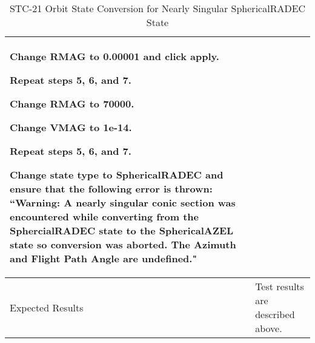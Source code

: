 \begin{table}[htbp!]
\begin{tabular}{|p{1.05 in} |p{4.75 in} |}
\begin{compactenum}
                 \item Change RMAG to 0.00001 and click apply.
                 \item Repeat steps 5, 6, and 7.
                 \item Change RMAG to 70000.
                 \item Change VMAG to 1e-14.
                 \item Repeat steps 5, 6, and 7.
                 \item Change state type to SphericalRADEC and ensure that the following error is thrown: ``Warning: A nearly singular conic section was encountered while converting from the SphercialRADEC state to the SphericalAZEL state so conversion was aborted.  The Azimuth and Flight Path Angle are undefined."
         \end{compactenum}
         \\ \hline
         Expected Results & Test results are described above.\\
      \hline
      \end{tabular}
      \label{Table:STC-21}
      \caption{STC-21 Orbit State Conversion for Nearly Singular SphericalRADEC State}
\end{table} 